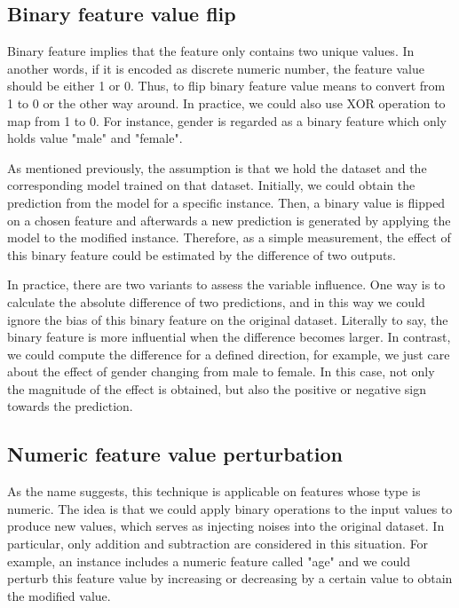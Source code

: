 \subsection{Binary feature value flip}

Binary feature implies that the feature only contains two unique values. In another words, if it is encoded as discrete numeric number, the feature value should be either 1 or 0. Thus, to flip binary feature value means to convert from 1 to 0 or the other way around. In practice, we could also use XOR operation to map from 1 to 0. For instance, gender is regarded as a binary feature which only holds value "male" and "female". 

As mentioned previously, the assumption is that we hold the dataset and the corresponding model trained on that dataset. Initially, we could obtain the prediction from the model for a specific instance. Then, a binary value is flipped on a chosen feature and afterwards a new prediction is generated by applying the model to the modified instance. Therefore, as a simple measurement, the effect of this binary feature could be estimated by the difference of two outputs. 

In practice, there are two variants to assess the variable influence. One way is to calculate the absolute difference of two predictions, and in this way we could ignore the bias of this binary feature on the original dataset. Literally to say, the binary feature is more influential when the difference becomes larger. In contrast, we could compute the difference for a defined direction, for example, we just care about the effect of gender changing from male to female. In this case, not only the magnitude of the effect is obtained, but also the positive or negative sign towards the prediction.  

\subsection{Numeric feature value perturbation}

As the name suggests, this technique is applicable on features whose type is numeric. The idea is that we could apply binary operations to the input values to produce new values, which serves as injecting noises into the original dataset. In particular, only addition and subtraction are considered in this situation. For example, an instance includes a numeric feature called "age" and we could perturb this feature value by increasing or decreasing by a certain value to obtain the modified value. 

